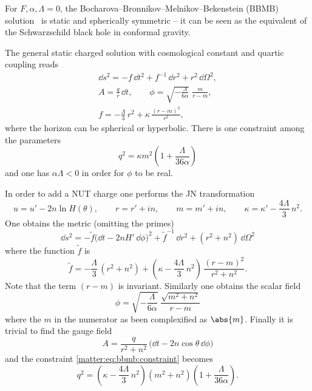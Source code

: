 For $F, \alpha, \Lambda = 0$, the Bocharova--Bronnikov--Melnikov--Bekenstein (BBMB) solution~\cite{Bekenstein:1974:ExactSolutionsEinsteinconformal, Bocharova:1970:ExactSolutionSystem} is static and spherically symmetric -- it can be seen as the equivalent of the Schwarzschild black hole in conformal gravity.

The general static charged solution with cosmological constant and quartic coupling reads
\begin{subequations}
\begin{gather}
	\dd s^2 = - f\, \dd t^2 + f^{-1}\, \dd r^2 + r^2\, \dd\Omega^2, \\
	A = \frac{q}{r}\, \dd t, \qquad
	\phi = \sqrt{- \frac{\Lambda}{6 \alpha}}\; \frac{m}{r - m}, \\
	f = - \frac{\Lambda}{3}\, r^2 + \kappa\, \frac{(r - m)^2}{r^2},
\end{gather}
\end{subequations}
where the horizon can be spherical or hyperbolic.
There is one constraint among the parameters
\begin{equation}
	\label{matter:eq:bbmb:constraint}
	q^2 = \kappa m^2 \left( 1 + \frac{\Lambda}{36 \alpha} \right)
\end{equation} 
and one has $\alpha \Lambda < 0$ in order for $\phi$ to be real.

In order to add a NUT charge one performs the JN transformation\footnotemark{}%
\begin{equation}
	u = u' - 2 n \ln H(\theta), \qquad
	r = r' + i n, \qquad
	m = m' + i n, \qquad
	\kappa = \kappa' - \frac{4\Lambda}{3}\, n^2.
\end{equation} 
One obtains the metric (omitting the primes)
\begin{equation}
	\dd s^2 = - \tilde f \big(\dd t - 2 n H'\, \dd\phi \big)^2
		+ \tilde f^{-1}\, \dd r^2
		+ (r^2 + n^2)\, \dd\Omega^2
\end{equation}
where the function $\tilde f$ is
\begin{equation}
	\tilde f = - \frac{\Lambda}{3}\, (r^2 + n^2) + \left( \kappa - \frac{4\Lambda}{3}\, n^2 \right)\, \frac{(r - m)^2}{r^2 + n^2}.
\end{equation} 
Note that the term $(r - m)$ is invariant.
Similarly one obtains the scalar field
\begin{equation}
	\phi = \sqrt{- \frac{\Lambda}{6 \alpha}}\; \frac{\sqrt{m^2 + n^2}}{r - m}
\end{equation} 
where the $m$ in the numerator as been complexified as $\abs{m}$.
Finally it is trivial to find the gauge field
\begin{equation}
	A = \frac{q}{r^2 + n^2}\, \big( \dd t - 2 n \cos \theta\, \dd \phi \big)
\end{equation} 
and the constraint \eqref{matter:eq:bbmb:constraint} becomes
\begin{equation}
	q^2 = \left( \kappa - \frac{4\Lambda}{3}\, n^2 \right) (m^2 + n^2) \left( 1 + \frac{\Lambda}{36 \alpha} \right).
\end{equation} 

